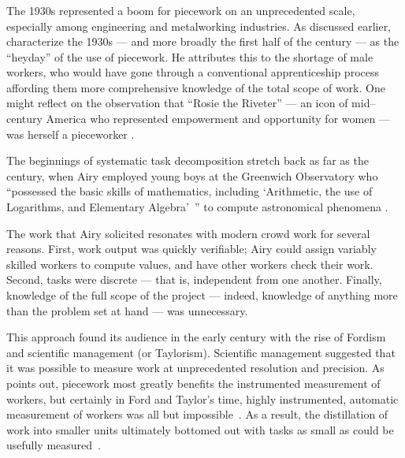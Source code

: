 \documentclass[trackingWork]{subfiles}
\begin{document}
\subsubsection{\pieceworkpers}
The 1930s represented a boom for piecework on an unprecedented scale,
especially among engineering and metalworking industries.
As discussed earlier, \citeauthor{hart2013rise} characterize the 1930s
--- and more broadly the first half of the  century ---
as the ``heyday'' of the use of piecework.
He attributes this to the shortage of male workers,
who would have gone through a conventional apprenticeship process
affording them more comprehensive knowledge of the total scope of work.
One might reflect on the observation that ``Rosie the Riveter''
--- an icon of mid-- century America who represented empowerment and opportunity for women \cite{honey1985creating} ---
was herself a pieceworker
\cite{davies2014origins}.



The beginnings of
systematic task decomposition
stretch back as far as the  century,
when Airy employed young boys at the Greenwich Observatory who
``possessed the basic skills of mathematics, including
`Arithmetic, the use of Logarithms, and Elementary Algebra'~''
to compute astronomical phenomena
\cite{grier2013computers}.

The work that Airy solicited resonates with modern crowd work for several reasons.
First, work output was quickly verifiable;
Airy could assign variably skilled workers to compute values,
and have other workers check their work.
Second, tasks were discrete --- that is, independent from one another.
Finally, knowledge of the full scope of the project
--- indeed, knowledge of anything more than the problem set at hand ---
was unnecessary.

This approach found its audience in the early  century with the rise of Fordism and scientific management (or Taylorism).
Scientific management suggested that it was possible to measure work  at unprecedented resolution and precision.
As \citeauthor{Brown01041990} points out, piecework most greatly benefits the instrumented measurement of workers, but certainly in Ford and Taylor's time, highly instrumented, automatic measurement of workers was all but impossible~\cite{Brown01041990}.
As a result, the distillation of work into smaller units ultimately bottomed out with tasks as small as could be usefully measured~\cite{10.2307/23702539}.
\end{document}
